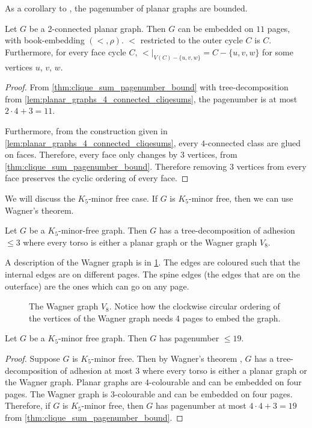 As a corollary to \textcite{hickingbothamStackNumberCliqueSum2023}, the pagenumber of planar graphs are bounded.

\begin{theorem}\label{thm:Planar Graph Hickingbotham Bound}
	Let \(G\) be a 2-connected planar graph. Then $G$ can be embedded on $11$ pages, with book-embedding $(<, \rho)$. $<$ restricted to the outer cycle $C$ is $C$. Furthermore, for every face cycle $C$, $<|_{V(C) - \{u, v, w\}} = C - \{u, v, w\}$ for some vertices $u$, $v$, $w$. 
\end{theorem}
\begin{proof}
	From \cref{thm:clique_sum_pagenumber_bound} with tree-decomposition from \cref{lem:planar_graphs_4_connected_cliqesums}, the pagenumber is at most \(2 \cdot 4 + 3 = 11\).

	Furthermore, from the construction given in \cref{lem:planar_graphs_4_connected_cliqesums}, every $4$-connected class are glued on faces. Therefore, every face only changes by $3$ vertices, from \cref{thm:clique_sum_pagenumber_bound}. Therefore removing $3$ vertices from every face preserves the cyclic ordering of every face.
\end{proof}

We will discuss the \(K_5\)-minor free case. If \(G\) is \(K_5\)-minor free, then we can use Wagner's theorem.
\begin{theorem}\label{thm:WagnersTheorem}
	Let \(G\) be a \(K_5\)-minor-free graph. Then \(G\) has a tree-decomposition of adhesion $\leq 3$ where every torso is either a planar graph or the Wagner graph \(V_8\).
\end{theorem}
A description of the Wagner graph is in \cref{fig:wagner}. The edges are coloured such that the internal edges are on different pages. The spine edges (the edges that are on the outerface) are the ones which can go on any page.
\begin{figure}[h!]
	\centering
	\begin{tikzpicture}[thick,scale=2, every node/.style={scale=2}]
		
	\end{tikzpicture}
	\caption[Wagner graph]{The Wagner graph $V_8$. Notice how the clockwise circular ordering of the vertices of the Wagner graph needs 4 pages to embed the graph. }\label{fig:wagner}
\end{figure}

\begin{theorem}
	Let \(G\) be a \(K_5\)-minor free graph. Then \(G\) has pagenumber \(\leq 19\).
\end{theorem}

\begin{proof}
	Suppose \(G\) is \(K_5\)-minor free. Then by Wagner's theorem \cite{wagnerUeberEigenschaftEbenen1937}, \(G\) has a tree-decomposition of adhesion at most 3 where every torso is either a planar graph or the Wagner graph.
	Planar graphs are \(4\)-colourable and can be embedded on four pages. The Wagner graph is \(3\)-colourable and can be embedded on four pages. Therefore, if \(G\) is \(K_5\)-minor free, then \(G\) has pagenumber at most \(4 \cdot 4 + 3 = 19\) from \cref{thm:clique_sum_pagenumber_bound}.
\end{proof}